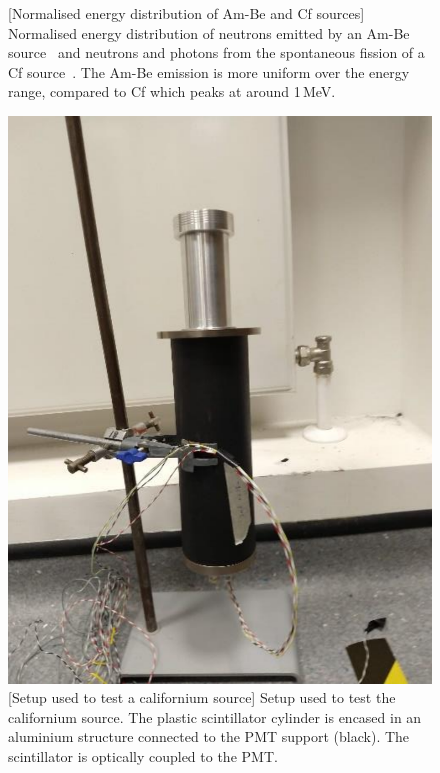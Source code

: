 \begin{figure}
	\centering
	\resizebox{0.6\textwidth}{!}{}
	[Normalised energy distribution of Am-Be and Cf sources]%
	{Normalised energy distribution of neutrons emitted by an Am-Be source~\cite{PMID:4744412} %
	and neutrons and photons from the spontaneous fission of a Cf source~\cite{PhysRev.104.699, PhysRev.108.411}.
	The Am-Be emission is more uniform over the energy range, compared to Cf which %
	peaks at around 1\,MeV.}
	\label{fig:spectra}
\end{figure}


\begin{figure}
	\centering
	\includegraphics[width=0.3\linewidth]{pics/device.png}
	\hspace{1em}
	[Setup used to test a californium source]%
	{Setup used to test the californium source.
		The plastic scintillator cylinder is encased in an aluminium structure %
		connected to the PMT support (black).
		The scintillator is optically coupled to the PMT.}
	\label{fig:setup}
\end{figure}

